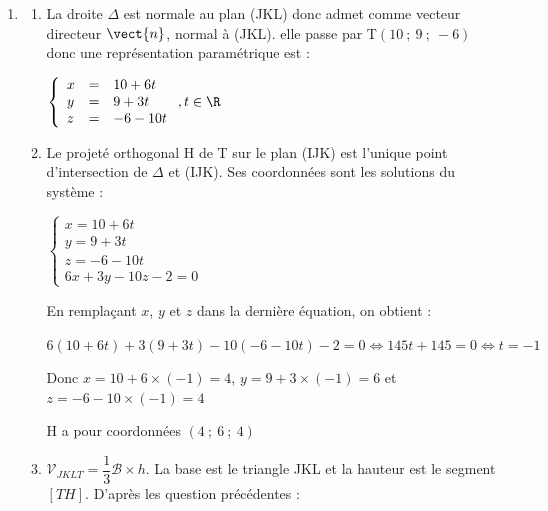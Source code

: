 \begin{enumerate}
\begin{enumerate}
$\left(\vect{JK}~,~\vect{JL}\right)$ est donc une base du plan (JKL).

Calculons :

$\vect{n}.\vect{JK}=6\times(-1)+3\times 2+(-10)\times 0=0$ et $\vect{n}.\vect{JL}=6\times(-4)+3\times (-2)+(-10)\times (-3)=0$.

Le vecteur $\vect{n}$ est donc orthogonal aux $\vect{JK}$ et $\vect{JL}$. C'est donc un vecteur normal au plan (JKL).
		\item Le plan (JKL) a pour équation cartésienne : $ax+by+cz+d=0$, où $(a~;~b~;~c)$ sont les cordonnées d'un vecteur normal au plan. En prenant comme vecteur normal le vecteur $\vect{n}$, on obtient : (JKL) : $6x + 3y - 10z + d = 0$. 

Or $J\in \text{(JKL)}$ donc $12+0-10+d=0$ donc $d=-2$. Donc (JKL) a pour équation 

$6x + 3y - 10z - 2 = 0$.
	\end{enumerate}
	\item
	\begin{enumerate}
		\item La droite $\Delta$ est normale au plan (JKL) donc admet comme vecteur directeur $\vect{n}$, normal à (JKL). elle passe par T$(10~;~9~;~-6)$ donc une représentation paramétrique est :
		
$\left\{\begin{array}{l c l}	x&=&10+6t\\y &=&9+3t\\z&=&-6-10t			\end{array}\right. , t \in \R$
		\item Le projeté orthogonal H de T sur le plan (IJK) est l'unique point d'intersection de $\Delta$ et (IJK). Ses coordonnées sont les solutions du système :

$\left\{\begin{array}{l}	x=10+6t\\y =9+3t\\z=-6-10t\\6x+3y-10z-2=0			\end{array}\right.$

En remplaçant $x$, $y$ et $z$ dans la dernière équation, on obtient :

$6(10+6t)+3(9+3t)-10(-6-10t)-2=0 \iff 145t+145=0 \iff t=-1$

Donc $x=10+6\times(-1)=4$, $y=9+3\times(-1)=6$ et $z=-6-10\times(-1)=4$

H a pour coordonnées $(4~;~6~;~4)$
\item $\mathcal{V}_{JKLT}  = \dfrac13 \mathcal{B} \times h$. La base est le triangle JKL et la hauteur est le segment $[TH]$. D'après les question précédentes :


\end{enumerate}
\end{enumerate}
